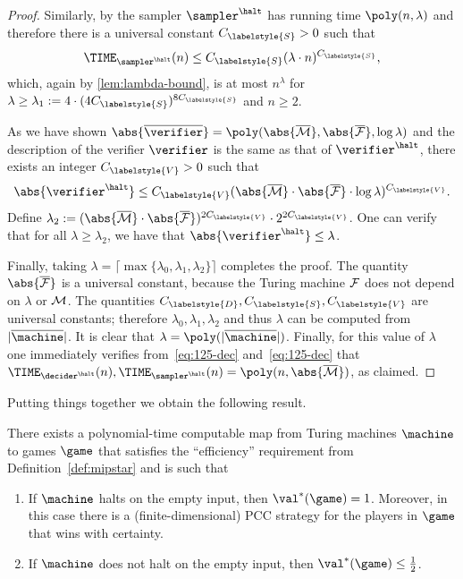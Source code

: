 \begin{proof}
  Similarly, by  the sampler $\sampler^\halt$ has running time $\poly(n, \lambda)$
  and therefore there is a universal constant $C_{\labelstyle{S}}>0$ such that
  \begin{equation}\label{eq:125-samp}
    \TIME_{\sampler^\halt}(n) \le C_{\labelstyle{S}}(\lambda \cdot n)^{C_{\labelstyle{S}}},
  \end{equation}
  which, again by \cref{lem:lambda-bound}, is at most $n^\lambda$ for $\lambda
  \ge \lambda_1 := 4 \cdot (4C_{\labelstyle{S}})^{8C_{\labelstyle{S}}}$ and $n \ge 2$.

  As we have shown $\abs{\overline{\verifier}} = \poly(\abs{\overline{\cal{M}}}, \abs{\overline{\cal{F}}}, \log
  \lambda)$ and the description of the verifier $\verifier$ is the same as that
  of $\verifier^\halt$, there exists an integer $C_{\labelstyle{V}}>0$ such that
  \begin{equation*}
    \abs{\verifier^\halt} \le C_{\labelstyle{V}}(\abs{\overline{\cal{M}}} \cdot \abs{\overline{\cal{F}}} \cdot \log
    \lambda)^{C_{\labelstyle{V}}}.
  \end{equation*}
  Define $\lambda_2 := (\abs{\overline{\cal{M}}} \cdot \abs{\overline{\cal{F}}})^{2 C_{\labelstyle{V}}} \cdot 2^{2 C_{\labelstyle{V}}}$. One can verify that 
  for all $\lambda \geq \lambda_2$, we have that $\abs{\verifier^\halt}  \leq \lambda$.

  Finally, taking $\lambda = \big\lceil\max\{\lambda_0,\lambda_1,\lambda_2 \} \big \rceil$ completes the proof.
	The quantity $\abs{\overline{\cal{F}}}$ is a universal constant, because the Turing machine $\cal{F}$ does not depend on $\lambda$ or $\cal{M}$. The quantities $	C_{\labelstyle{D}}, C_{\labelstyle{S}}, C_{\labelstyle{V}}$ are universal constants; therefore $\lambda_0, \lambda_1, \lambda_2$ and thus $\lambda$ can be computed from $|\overline{\machine}|$. It is clear that $\lambda = \poly(|\overline{\machine}|)$. Finally, for this value of $\lambda$ one immediately verifies from~\eqref{eq:125-dec} and~\eqref{eq:125-dec} that $\TIME_{\decider^\halt}(n),\TIME_{\sampler^\halt}(n) = \poly(n, \abs{\overline{\cal{M}}})$, as claimed. 
	
\end{proof}


Putting things together we obtain the following result. 

\begin{theorem}
  \label{thm:halting}
  There exists a polynomial-time computable map from Turing machines $\machine$ to games $\game$ that satisfies the ``efficiency'' requirement from Definition~\ref{def:mipstar} and is
	such that
	\begin{enumerate}
  \item If $\machine$ halts on the empty input, then $\val^*(\game) = 1$. Moreover, in this case there is a (finite-dimensional) PCC strategy for the players in $\game$ that wins with certainty. 
  \item If $\machine$ does not halt on the empty input, then $\val^*(\game) \leq
    \frac{1}{2}$.
	\end{enumerate}
\end{theorem}


